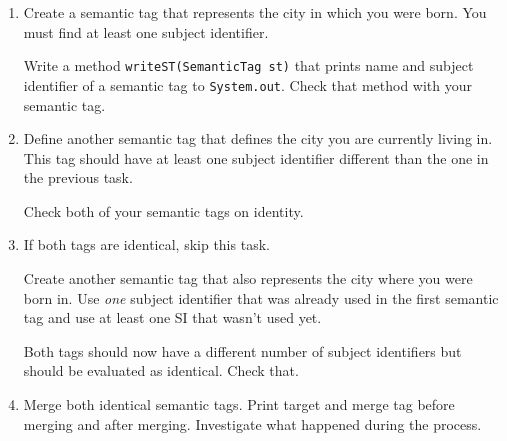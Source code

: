 \begin{enumerate}
    \item 
Create a semantic tag that represents the city in which you were born. You must find at least one subject identifier.

Write a method {\tt writeST(SemanticTag st)} that prints name and subject identifier of a semantic tag to {\tt System.out}. Check that method with your semantic tag.

\item
Define another semantic tag that defines the city you are currently living in. This tag should have at least one subject identifier different than the one in the previous task.

Check both of your semantic tags on identity.

\item
If both tags are identical, skip this task.

Create another semantic tag that also represents the city where you were born in. Use {\it one} subject identifier that was already used in the first semantic tag and use at least one SI that wasn't used yet.

Both tags should now have a different number of subject identifiers but should be evaluated as identical. Check that.

\item
Merge both identical semantic tags. Print target and merge tag before merging and after merging. Investigate what happened during the process.

\end{enumerate}

